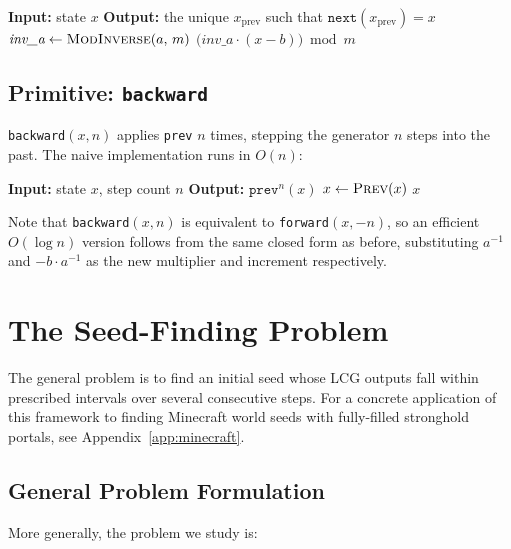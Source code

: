 \documentclass[11pt]{article}
\theoremstyle{plain}
\theoremstyle{definition}
\begin{document}
\begin{algorithm}[H]
\caption{\texttt{prev}$(x)$}
\begin{algorithmic}[1]
    \State \textbf{Input:} state $x$
    \State \textbf{Output:} the unique $x_{\text{prev}}$ such that $\texttt{next}(x_{\text{prev}}) = x$
    \State $\textit{inv\_a} \gets \textsc{ModInverse}(a,\, m)$
    \State \Return $\bigl(\textit{inv\_a} \cdot (x - b)\bigr) \bmod m$
\end{algorithmic}
\end{algorithm}
\subsection{\textbf{Primitive: }\texttt{backward}}

\texttt{backward}$(x, n)$ applies \texttt{prev} $n$ times, stepping the generator $n$ steps into
the past. The naive implementation runs in $O(n)$:

\begin{algorithm}[H]
\caption{\texttt{backward}$(x, n)$}
\begin{algorithmic}[1]
    \State \textbf{Input:} state $x$, step count $n$
    \State \textbf{Output:} $\texttt{prev}^n(x)$
        \State $x \gets \textsc{Prev}(x)$
    \EndFor
    \State \Return $x$
\end{algorithmic}
\end{algorithm}
\noindent Note that \texttt{backward}$(x, n)$ is equivalent to \texttt{forward}$(x, -n)$, so an
efficient $O(\log n)$ version follows from the same closed form as before, substituting $a^{-1}$
and $-b \cdot a^{-1}$ as the new multiplier and increment respectively.

\section{The Seed-Finding Problem}

The general problem is to find an initial seed whose LCG outputs fall within prescribed intervals
over several consecutive steps. For a concrete application of this framework to finding
Minecraft world seeds with fully-filled stronghold portals, see Appendix~\ref{app:minecraft}.

\subsection{General Problem Formulation}

More generally, the problem we study is:
\end{document}
